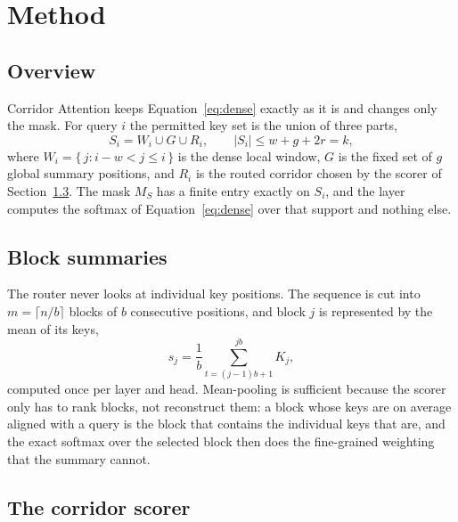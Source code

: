 \section{Method}\label{sec:method}

\subsection{Overview}\label{sec:overview}

Corridor Attention keeps Equation~\eqref{eq:dense} exactly as it is and
changes only the mask. For query $i$ the permitted key set is the union of
three parts,
\begin{equation}\label{eq:support}
  S_i = W_i \cup G \cup R_i, \qquad |S_i| \le w + g + 2r = k,
\end{equation}
where $W_i = \{\, j : i - w < j \le i \,\}$ is the dense local window, $G$ is
the fixed set of $g$ global summary positions, and $R_i$ is the routed
corridor chosen by the scorer of Section~\ref{sec:scorer}. The mask $M_S$ has
a finite entry exactly on $S_i$, and the layer computes the softmax of
Equation~\eqref{eq:dense} over that support and nothing else.

\subsection{Block summaries}\label{sec:summaries}

The router never looks at individual key positions. The sequence is cut into
$m = \lceil n/b \rceil$ blocks of $b$ consecutive positions, and block $j$ is
represented by the mean of its keys,
\begin{equation}\label{eq:summary}
  s_j = \frac{1}{b} \sum_{t=(j-1)b+1}^{jb} K_j ,
\end{equation}
computed once per layer and head. Mean-pooling is sufficient because the
scorer only has to rank blocks, not reconstruct them: a block whose keys are
on average aligned with a query is the block that contains the individual
keys that are, and the exact softmax over the selected block then does the
fine-grained weighting that the summary cannot.

\subsection{The corridor scorer}\label{sec:scorer}

